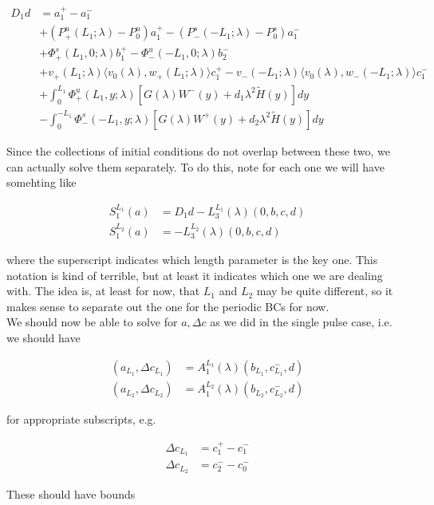 \documentclass[12pt]{article}
\begin{document}
\begin{enumerate}
\begin{align*}
D_1 d &= a_1^+ - a_1^- \\
&+ (P^u_+(L_1; \lambda) - P_0^u)a_1^+ - (P^s_-(-L_1; \lambda) - P_0^s)a_1^- \\
&+ \Phi^s_+(L_1, 0; \lambda)b_1^+ - \Phi^u_-(-L_1, 0; \lambda)b_2^- \\
&+ v_+(L_1; \lambda) \langle v_0(\lambda), w_+(L_1; \lambda) \rangle c_1^+ - v_-(-L_1; \lambda) \langle v_0(\lambda), w_-(-L_1; \lambda) \rangle c_1^- \\
&+ \int_0^{L_1} \Phi^u_+(L_1, y; \lambda) [ G(\lambda)W^-(y) + d_1 \lambda^2 \tilde{H}(y) ] dy \\
&- \int_0^{-L_1} \Phi^s_-(-L_1, y; \lambda) [ G(\lambda)W^+(y) + d_2 \lambda^2 \tilde{H}(y) ] dy
\end{align*}

Since the collections of initial conditions do not overlap between these two, we can actually solve them separately. To do this, note for each one we will have somehting like

\begin{align*}
S_1^{L_1}(a) &= D_1 d - L_3^{L_1}(\lambda)(0, b, c, d) \\
S_1^{L_2}(a) &= - L_3^{L_2}(\lambda) (0, b, c, d)
\end{align*}

where the superscript indicates which length parameter is the key one. This notation is kind of terrible, but at least it indicates which one we are dealing with. The idea is, at least for now, that $L_1$ and $L_2$ may be quite different, so it makes sense to separate out the one for the periodic BCs for now.\\

We should now be able to solve for $a, \Delta c$ as we did in the single pulse case, i.e. we should have 

\begin{align*}
(a_{L_1}, \Delta c_{L_1}) &= A_1^{L_1}(\lambda)(b_{L_1}, c_{L_1}^-,d) \\
(a_{L_2}, \Delta c_{L_2}) &= A_1^{L_2}(\lambda)(b_{L_2}, c_{L_2}^-,d) 
\end{align*}

for appropriate subscripts, e.g.

\begin{align*}
\Delta c_{L_1} &= c_1^+ - c_1^- \\
\Delta c_{L_2} &= c_2^- - c_0^-
\end{align*}

 These should have bounds


\end{enumerate}
\end{document}

